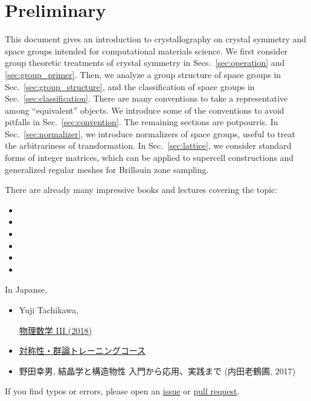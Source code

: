 \section{\label{sec:preliminary}Preliminary}

This document gives an introduction to crystallography on crystal symmetry and space groups intended for computational materials science.
We first consider group theoretic treatments of crystal symmetry in Secs.~\ref{sec:operation} and \ref{sec:group_primer}.
Then, we analyze a group structure of space groups in Sec.~\ref{sec:group_structure}, and the classification of space groups in Sec.~\ref{sec:classification}.
There are many conventions to take a representative among ``equivalent'' objects.
We introduce some of the conventions to avoid pitfalls in Sec.~\ref{sec:convention}.
The remaining sections are potpourris.
In Sec.~\ref{sec:normalizer}, we introduce normalizers of space groups, useful to treat the arbitrariness of transformation.
In Sec.~\ref{sec:lattice}, we consider standard forms of integer matrices, which can be applied to supercell constructions and generalized regular meshes for Brillouin zone sampling.

There are already many impressive books and lectures covering the topic:
\begin{itemize}
    \item {}
    \item {}
    \item {}
    \item {}
    \item {}
    \item {}
\end{itemize}

In Japanse,
\begin{itemize}
    \item Yuji Tachikawa, \begin{CJK}{UTF8}{ipxm}\href{https://member.ipmu.jp/yuji.tachikawa/lectures/2018-butsurisuugaku3/}{物理数学 III (2018)}\end{CJK}
    \item \begin{CJK}{UTF8}{ipxm}\href{http://pfwww.kek.jp/trainingcourse/bunken.html}{対称性・群論トレーニングコース}\end{CJK}
    \item \begin{CJK}{UTF8}{ipxm}野田幸男, 結晶学と構造物性 入門から応用、実践まで (内田老鶴圃, 2017)\end{CJK}
\end{itemize}

If you find typos or errors, please open an \href{https://github.com/lan496/crystal-symmetry-primer/issues?q=is%3Aissue+is%3Aopen+sort%3Aupdated-desc}{issue} or \href{https://github.com/lan496/crystal-symmetry-primer/pulls?q=is%3Apr+is%3Aopen+sort%3Aupdated-desc}{pull request}.

